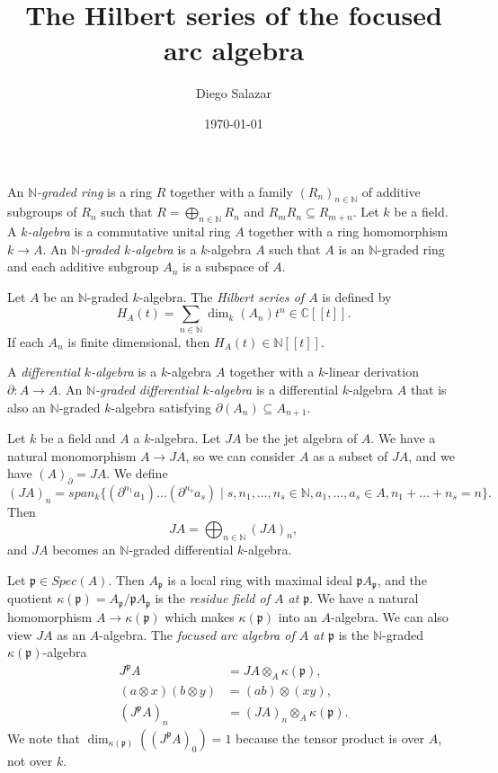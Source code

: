 \documentclass[a4paper, 12pt, reqno]{amsart}
\theoremstyle{remark}
\begin{document}
\title{The Hilbert series of the focused arc algebra}
\author{Diego Salazar}
\date{\today}
\maketitle

An \emph{$\mathbb{N}$-graded ring} is a ring $R$ together with a family $(R_n)_{n \in \mathbb{N}}$ of additive subgroups of $R_n$ such that $R = \bigoplus_{n \in \mathbb{N}} R_n$ and $R_mR_n \subseteq R_{m + n}$.
Let $k$ be a field.
A \emph{$k$-algebra} is a commutative unital ring $A$ together with a ring homomorphism $k \to A$.
An \emph{$\mathbb{N}$-graded $k$-algebra} is a $k$-algebra $A$ such that $A$ is an $\mathbb{N}$-graded ring and each additive subgroup $A_n$ is a subspace of $A$.

Let $A$ be an $\mathbb{N}$-graded $k$-algebra.
The \emph{Hilbert series of $A$} is defined by
\begin{equation*}
  H_A(t) = \sum_{n \in \mathbb{N}}\dim_k(A_n)t^n \in \mathbb{C}[[t]].
\end{equation*}
If each $A_n$ is finite dimensional, then $H_A(t) \in \mathbb{N}[[t]]$.

A \emph{differential $k$-algebra} is a $k$-algebra $A$ together with a $k$-linear derivation $\partial: A \to A$.
An \emph{$\mathbb{N}$-graded differential $k$-algebra} is a differential $k$-algebra $A$ that is also an $\mathbb{N}$-graded $k$-algebra satisfying $\partial(A_n) \subseteq A_{n + 1}$.

Let $k$ be a field and $A$ a $k$-algebra.
Let $JA$ be the jet algebra of $A$.
We have a natural monomorphism $A \to JA$, so we can consider $A$ as a subset of $JA$, and we have $(A)_{\partial} = JA$.
We define
\begin{equation*}
  (JA)_n = span_k\{(\partial^{n_1}a_1)\dots(\partial^{n_s}a_s) \mid s, n_1, \dots, n_s \in \mathbb{N}, a_1, \dots, a_s \in A, n_1 + \dots + n_s = n\}.
\end{equation*}
Then
\begin{equation*}
  JA = \bigoplus_{n \in \mathbb{N}}(JA)_n,
\end{equation*}
and $JA$ becomes an $\mathbb{N}$-graded differential $k$-algebra.

Let $\mathfrak{p} \in Spec(A)$.
Then $A_{\mathfrak{p}}$ is a local ring with maximal ideal $\mathfrak{p}A_{\mathfrak{p}}$, and the quotient $\kappa(\mathfrak{p}) = A_{\mathfrak{p}}/\mathfrak{p}A_{\mathfrak{p}}$ is the \emph{residue field of $A$ at $\mathfrak{p}$}.
We have a natural homomorphism $A \to \kappa(\mathfrak{p})$ which makes $\kappa(\mathfrak{p})$ into an $A$-algebra.
We can also view $JA$ as an $A$-algebra. 
The \emph{focused arc algebra of $A$ at $\mathfrak{p}$} is the $\mathbb{N}$-graded $\kappa(\mathfrak{p})$-algebra
\begin{align*}
  J^{\mathfrak{p}}A &= JA \otimes_A \kappa(\mathfrak{p}), \\
  (a\otimes x)(b\otimes y) &= (ab)\otimes(xy), \\
  (J^{\mathfrak{p}}A)_n &= (JA)_n \otimes_A \kappa(\mathfrak{p}).
\end{align*}
We note that $\dim_{\kappa(\mathfrak{p})}((J^{\mathfrak{p}}A)_0) = 1$ because the tensor product is over $A$, not over $k$.
\end{document}
